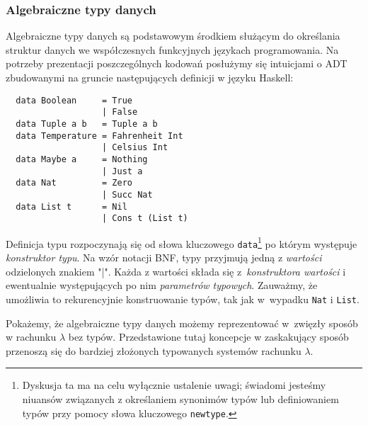 \subsubsection{Algebraiczne typy danych}
Algebraiczne typy danych są podstawowym środkiem służącym do określania struktur danych we współczesnych funkcyjnych językach programowania. Na potrzeby prezentacji poszczególnych kodowań posłużymy się intuicjami o ADT zbudowanymi na gruncie następujących definicji w języku Haskell:
\begin{verbatim}
  data Boolean     = True
                   | False
  data Tuple a b   = Tuple a b
  data Temperature = Fahrenheit Int
                   | Celsius Int
  data Maybe a     = Nothing
                   | Just a
  data Nat         = Zero
                   | Succ Nat
  data List t      = Nil
                   | Cons t (List t)
\end{verbatim}
Definicja typu rozpoczynają się od słowa kluczowego \texttt{data}\footnote{Dyskusja ta ma na celu wyłącznie ustalenie uwagi; świadomi jesteśmy niuansów związanych z określaniem synonimów typów lub definiowaniem typów przy pomocy słowa kluczowego \texttt{newtype}.} po którym występuje \emph{konstruktor typu}. Na wzór notacji BNF, typy przyjmują jedną z \emph{wartości} odzielonych znakiem "|". Każda z wartości składa się z~\emph{konstruktora wartości} i ewentualnie występujących po nim \emph{parametrów typowych}. Zauważmy, że umożliwia to rekurencyjnie konstruowanie typów, tak jak w~wypadku \texttt{Nat} i \texttt{List}.

Pokażemy, że algebraiczne typy danych możemy reprezentować w~zwięzły sposób w rachunku \(\lambda\) bez typów. Przedstawione tutaj koncepcje w zaskakujący sposób przenoszą się do bardziej złożonych typowanych systemów rachunku \(\lambda\).

